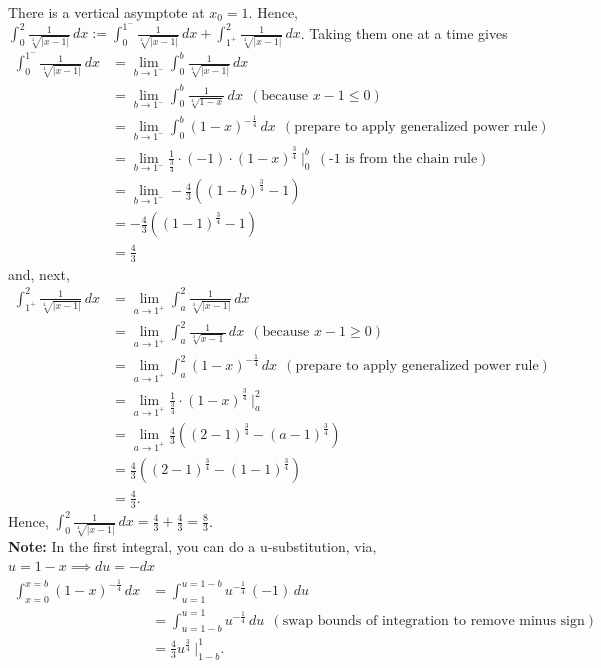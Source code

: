 \begin{enumerate}
       There is a vertical asymptote at $x_0=1$. Hence, $\int_0 ^2 \frac{1}{\sqrt[4]{|x-1|}} \, dx := \int_0 ^{1^-} \frac{1}{\sqrt[4]{|x-1|}} \, dx +  \int_{1^+}^2 \frac{1}{\sqrt[4]{|x-1|}} \, dx$. Taking them one at a time gives
    \begin{align*}
        \int_0 ^{1^-} \frac{1}{\sqrt[4]{|x-1|}} \, dx &=  \lim_{b \to 1^-} \int_0^b \frac{1}{\sqrt[4]{|x-1|}} \, dx \\[1em]
        &=  \lim_{b \to 1^-} \int_0^b \frac{1}{\sqrt[4]{1-x}} \, dx ~~(\text{because }x-1\le 0 )\\[1em]
        &= \lim_{b \to 1^-} \int_0^b (1-x)^{-\frac{1}{4}} \, dx ~~(\text{prepare to apply generalized power rule})\\[1em]
         &= \lim_{b \to 1^-} \frac{1}{\frac{3}{4}}\cdot (-1)\cdot (1-x)^{\frac{3}{4}}~\bigg|_0^b ~~(\text{-1 is from the chain rule})\\[1em]
         & = \lim_{b \to 1^-} -\frac{4}{3} \left( (1-b)^{ \frac{3}{4} } - 1 \right)\\[1em]
         &= -\frac{4}{3} \left( (1-1)^{ \frac{3}{4} } - 1 \right)\\[1em]
         &= \frac{4}{3}
    \end{align*}
    and, next, 
        \begin{align*}
        \int_{1^+}^2 \frac{1}{\sqrt[4]{|x-1|}} \, dx &=  \lim_{a \to 1^+} \int_a^2 \frac{1}{\sqrt[4]{|x-1|}} \, dx \\[1em]
        &=  \lim_{a \to 1^+}  \int_a^2  \frac{1}{\sqrt[4]{x-1}} \, dx ~~(\text{because }x-1\ge 0 )\\[1em]
        &= \lim_{a \to 1^+} \int_a^2  (1-x)^{-\frac{1}{4}} \, dx ~~(\text{prepare to apply generalized power rule})\\[1em]
         &= \lim_{a \to 1^+}  \frac{1}{\frac{3}{4}}\cdot (1-x)^{\frac{3}{4}}~\bigg|_a^2 \\[1em]
         & = \lim_{a \to 1^+}  \frac{4}{3} \left( (2-1)^{ \frac{3}{4} } -  (a-1)^{ \frac{3}{4} }  \right)\\[1em]
         & = \frac{4}{3} \left( (2-1)^{ \frac{3}{4} } -  (1-1)^{ \frac{3}{4} }  \right)\\[1em]
         &= \frac{4}{3}.
    \end{align*}    
       Hence, $\int_0 ^2 \frac{1}{\sqrt[4]{|x-1|}}\, dx = \frac{4}{3}  + \frac{4}{3} = \frac{8}{3}$.\\

   \textbf{Note:} In the first integral, you can do a u-substitution, via, $u = 1-x \implies du = -dx$
  \begin{align*}
      \int_{x=0}^{x=b} (1-x)^{-\frac{1}{4}} \, dx &= \int_{u=1}^{u=1-b} u^{-\frac{1}{4}} \, (-1)\, du \\[1em]
      &= \int_{u=1-b}^{u=1}  u^{-\frac{1}{4}} \, du ~~(\text{swap bounds of integration to remove minus sign}) \\[1em]
      &= \frac{4}{3} u^{\frac{3}{4}} ~\bigg|_{1-b}^{1}.
  \end{align*} 
      


\end{enumerate}
